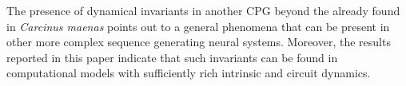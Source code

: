 
The presence of dynamical invariants in another CPG beyond the already found in \textit{Carcinus maenas} \cite{Elices2019} points out to a general phenomena that can be present in other more complex sequence generating neural systems. Moreover, the results reported in this paper indicate that such invariants can be found in computational models with sufficiently rich intrinsic and circuit dynamics.
